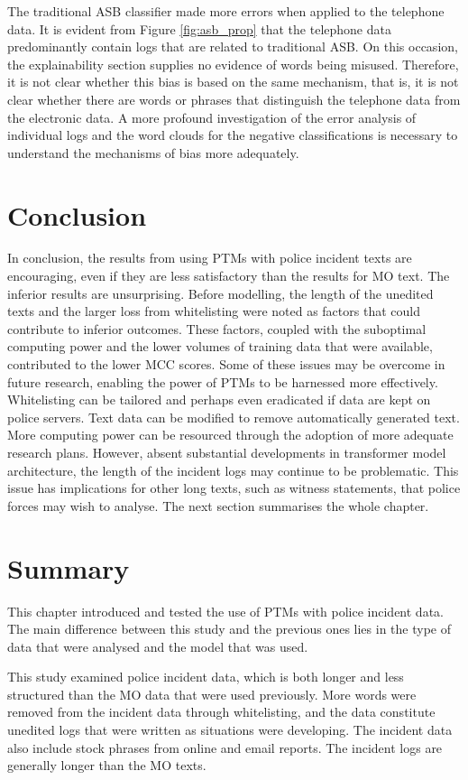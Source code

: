 The traditional ASB classifier made more errors when applied to the telephone data. It is evident from Figure \ref{fig:asb_prop}  that the telephone data predominantly contain logs that are related to traditional ASB. On this occasion, the explainability section supplies no evidence of words being misused. Therefore, it is not clear whether this bias is based on the same mechanism, that is, it is not clear whether there are words or phrases that distinguish the telephone data from the electronic data. A more profound investigation of the error analysis of individual logs and the word clouds for the negative classifications is necessary to understand the mechanisms of bias more adequately.


\section{Conclusion} In conclusion, the results from using PTMs with police incident texts are encouraging, even if they are less satisfactory than the results for MO text. The inferior results are unsurprising. Before modelling, the length of the unedited texts and the larger loss from whitelisting were noted as factors that could contribute to inferior outcomes. These factors, coupled with the suboptimal computing power and the lower volumes of training data that were available, contributed to the lower MCC scores. Some of these issues may be overcome in future research, enabling the power of PTMs to be harnessed more effectively. Whitelisting can be tailored and perhaps even eradicated if data are kept on police servers. Text data can be modified to remove automatically generated text. More computing power can be resourced through the adoption of more adequate research plans. However, absent substantial developments in transformer model architecture, the length of the incident logs may continue to be problematic. This issue has implications for other long texts, such as witness statements, that police forces may wish to analyse. The next section summarises the whole chapter.

\section{Summary} This chapter introduced and tested the use of PTMs with police incident data. The main difference between this study and the previous ones lies in the type of data that were analysed and the model that was used.

This study examined police incident data, which is both longer and less structured than the MO data that were used previously. More words were removed from the incident data through whitelisting, and the data constitute unedited logs that were written as situations were developing. The incident data also include stock phrases from online and email reports. The incident logs are generally longer than the MO texts.

